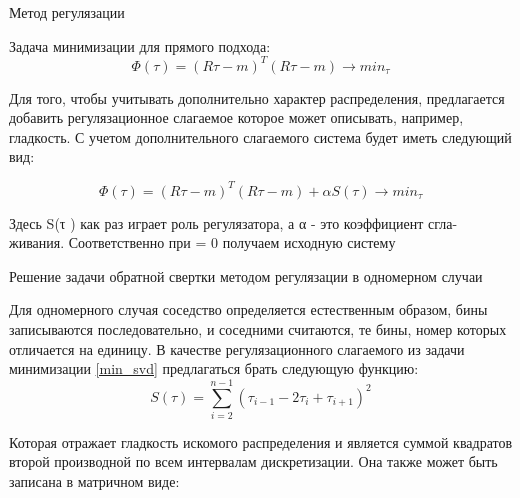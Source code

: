 \documentclass[fullscreen=true,russian,compress,%
	hyperref={unicode,bookmarks=false}]{presentation}
\begin{document}
\begin{frame}{Метод регулязации}
\begin{block}{}
   Задача минимизации для прямого подхода:
   \begin{equation}
      \Phi(\tau)=(R\tau-m)^T (R\tau-m) \to min_{\tau}
      \label{min_base}
   \end{equation}
\end{block}
\begin{block}{}
   Для того, чтобы учитывать дополнительно характер распределения, предлагается добавить регулязационное слагаемое  
   которое может описывать, например, гладкость. С учетом дополнительного слагаемого система будет иметь следующий вид: 

   \begin{equation}
      \Phi(\tau)=(R\tau-m)^T (R\tau-m) + \alpha S(\tau) \to min_{\tau}
      \label{min_svd}
   \end{equation}

   Здесь S(τ ) как раз играет роль регулязатора, а α - это коэффициент сгла-
   живания. Соответственно при \alpha = 0 получаем исходную систему
\end{block}
\end{frame}


\begin{frame}{Решение задачи обратной свертки методом регулязации в одномерном случаи}

Для одномерного случая соседство определяется естественным образом, бины записываются последовательно, и соседними считаются, те бины, номер 
которых отличается на единицу. В качестве регулязационного слагаемого из задачи минимизации \eqref{min_svd} предлагаться брать следующую функцию:
\begin{equation}
    S(\tau)= \sum_{i=2}^{n-1} (\tau_{i-1} - 2\tau_{i} + \tau_{i+1})^2
\end{equation}

Которая отражает гладкость искомого распределения и является суммой квадратов второй производной по всем интервалам дискретизации. 
Она также может быть записана в матричном виде:
\end{frame}
\end{document}
